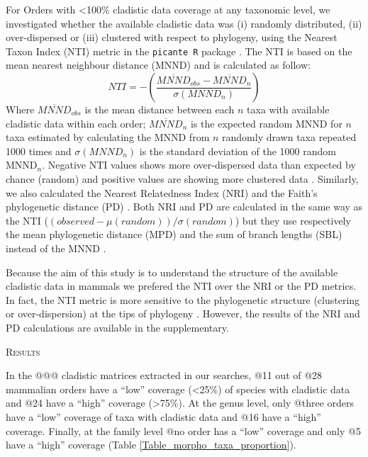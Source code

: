 \documentclass[12pt,letterpaper]{article}
\renewcommand{\section}[1]{%
\bigskip
\begin{center}
\begin{Large}
\normalfont\scshape #1
\medskip
\end{Large}
\end{center}}
\begin{document}
For Orders with \textless 100\% cladistic data coverage at any taxonomic level, we investigated whether the available cladistic data was (i) randomly distributed, (ii) over-dispersed or (iii) clustered with respect to phylogeny, using the Nearest Taxon Index (NTI) metric \citep{webb2002phylogenies} in the \texttt{picante R} package \citep{picante,R}.
The NTI is based on the mean nearest neighbour distance (MNND) and is calculated as follow:
\begin{equation}
NTI=-(\frac{\overline{MNND}_{obs}-\overline{MNND}_{n}}{\sigma(MNND_{n})})
\end{equation}
Where $\overline{MNND}_{obs}$ is the mean distance between each $n$ taxa with available cladistic data within each order; $\overline{MNND}_{n}$ is the expected random MNND for $n$ taxa estimated by calculating the MNND from $n$ randomly drawn taxa repeated 1000 times and $\sigma(MNND_{n})$ is the standard deviation of the 1000 random MNND$_{n}$.
Negative NTI values shows more over-dispersed data than expected by chance (random) and positive values are showing more clustered data \citep{webb2002phylogenies}.
Similarly, we also calculated the Nearest Relatedness Index (NRI) \citep{webb2002phylogenies,Cooper2012} and the Faith's phylogenetic distance (PD) \citep{Faith19921}.
Both NRI and PD are calculated in the same way as the NTI (\((observed-\mu(random))/\sigma(random)\)) but they use respectively the mean phylogenetic distance (MPD) and the sum of branch lengths (SBL) instead of the MNND \citep{Faith19921,webb2002phylogenies,Cooper2012}. 

Because the aim of this study is to understand the structure of the available cladistic data in mammals we prefered the NTI over the NRI or the PD metrics.
In fact, the NTI metric is more sensitive to the phylogenetic structure (clustering or over-dispersion) at the tips of phylogeny \citep{Cooper2008}.
However, the results of the NRI and PD calculations are available in the supplementary.

%
%

\section{Results}
In the @@@ cladistic matrices extracted in our searches, @11 out of @28 mammalian orders have a ``low'' coverage (\textless 25\%) of species with cladistic data and @24 have a ``high'' coverage (\textgreater 75\%).
At the genus level, only @three orders have a ``low'' coverage of taxa with cladistic data and @16 have a ``high'' coverage.
Finally, at the family level @no order has a ``low'' coverage and only @5 have a ``high'' coverage (Table \ref{Table_morpho_taxa_proportion}).
\end{document}
